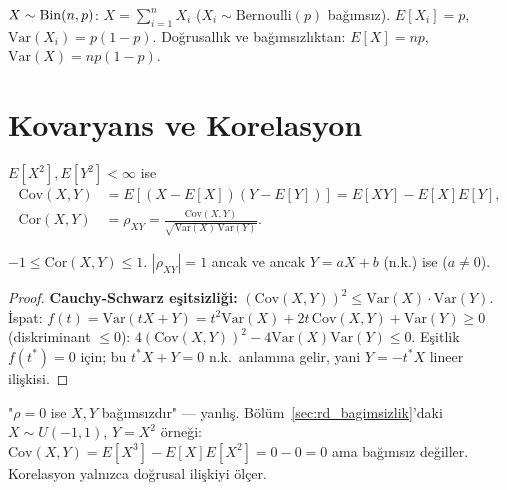 \begin{ornek}
$X \sim \operatorname{Bin}(n, p)$: $X = \sum_{i=1}^n X_i$ ($X_i \sim \mathrm{Bernoulli}(p)$ bağımsız).
$E[X_i] = p$, $\mathrm{Var}(X_i) = p(1-p)$.
Doğrusallık ve bağımsızlıktan: $E[X] = np$, $\mathrm{Var}(X) = np(1-p)$.
\end{ornek}

\section{Kovaryans ve Korelasyon}
\label{sec:kovaryans}

\begin{tanim}
\label{def:kovaryans}
$E[X^2], E[Y^2] < \infty$ ise
\begin{align*}
  \mathrm{Cov}(X, Y) &= E[(X - E[X])(Y - E[Y])] = E[XY] - E[X]E[Y], \\
  \mathrm{Cor}(X, Y) &= \rho_{XY} = \frac{\mathrm{Cov}(X,Y)}{\sqrt{\mathrm{Var}(X)\,\mathrm{Var}(Y)}}.
\end{align*}
\end{tanim}

\begin{teorem}
\label{thm:cauchy_schwarz}
$-1 \leq \mathrm{Cor}(X, Y) \leq 1$.
$|\rho_{XY}| = 1$ ancak ve ancak $Y = aX + b$ (n.k.) ise ($a \neq 0$).
\end{teorem}

\begin{proof}
\textbf{Cauchy-Schwarz eşitsizliği:} $(\mathrm{Cov}(X,Y))^2 \leq \mathrm{Var}(X) \cdot \mathrm{Var}(Y)$.
İspat: $f(t) = \mathrm{Var}(tX + Y) = t^2 \mathrm{Var}(X) + 2t\,\mathrm{Cov}(X,Y) + \mathrm{Var}(Y) \geq 0$
(diskriminant $\leq 0$): $4(\mathrm{Cov}(X,Y))^2 - 4\mathrm{Var}(X)\mathrm{Var}(Y) \leq 0$.
Eşitlik $f(t^*) = 0$ için; bu $t^*X + Y = 0$ n.k.\ anlamına gelir, yani $Y = -t^*X$ lineer ilişkisi.
\end{proof}

\begin{hataanalizi}
"$\rho = 0$ ise $X, Y$ bağımsızdır" --- yanlış.
Bölüm~\ref{sec:rd_bagimsizlik}'daki $X \sim U(-1,1)$, $Y = X^2$ örneği:
$\mathrm{Cov}(X,Y) = E[X^3] - E[X]E[X^2] = 0 - 0 = 0$ ama bağımsız değiller.
Korelasyon yalnızca doğrusal ilişkiyi ölçer.
\end{hataanalizi}

